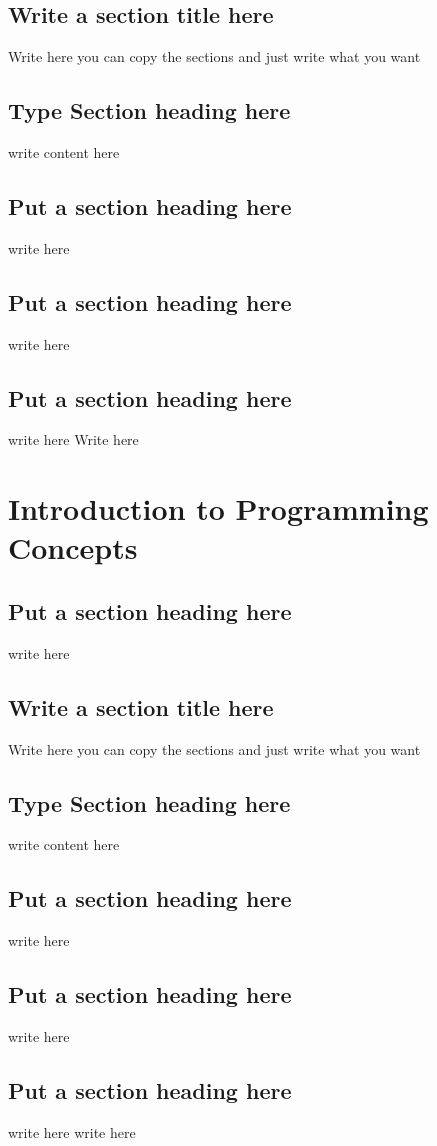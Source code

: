 \documentclass[a4paper,twoside]{scrbook}
\begin{document}
\section{Write a section title here}
Write here you can copy the sections and just write what you want
\section{Type Section heading here}
write content here
\section{Put a section heading here}
write here
\section{Put a section heading here}
write here
\section{Put a section heading here}
write here
Write here
\chapter{Introduction to Programming Concepts}\label{ch5}
\section{Put a section heading here}
write here
\section{Write a section title here}
Write here you can copy the sections and just write what you want
\section{Type Section heading here}
write content here
\section{Put a section heading here}
write here
\section{Put a section heading here}
write here
\section{Put a section heading here}
write here
write here
\end{document}
